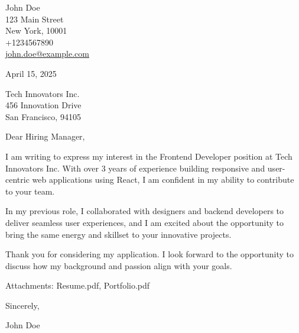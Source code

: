 \documentclass[11pt,a4paper]{article}
\begin{document}
\thispagestyle{empty}

\begin{flushleft}
John Doe\\
123 Main Street\\
New York, 10001\\
+1234567890\\
\href{mailto:john.doe@example.com}{john.doe@example.com}
\end{flushleft}

\begin{flushright}
April 15, 2025
\end{flushright}

\vspace{0.5cm}
Tech Innovators Inc.\\
456 Innovation Drive\\
San Francisco, 94105

\vspace{0.5cm}
\noindent Dear Hiring Manager,

\vspace{0.3cm}
I am writing to express my interest in the Frontend Developer position at Tech Innovators Inc. With over 3 years of experience building responsive and user-centric web applications using React, I am confident in my ability to contribute to your team.

\noindent In my previous role, I collaborated with designers and backend developers to deliver seamless user experiences, and I am excited about the opportunity to bring the same energy and skillset to your innovative projects.

\noindent Thank you for considering my application. I look forward to the opportunity to discuss how my background and passion align with your goals.

\vspace{0.5cm}
\noindent Attachments: Resume.pdf, Portfolio.pdf

\vspace{0.5cm}
\noindent Sincerely,

\vspace{1cm}
\noindent John Doe
\end{document}
